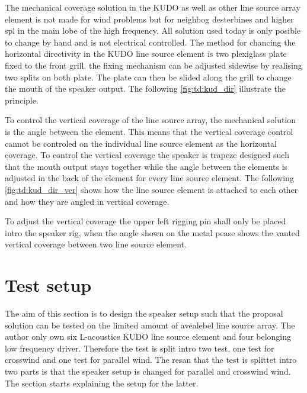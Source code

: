 


The mechanical coverage solution in the KUDO as well as other line source array element is not made for wind problems but for neighbog desterbines and higher \gls{spl} in the main lobe of the high frequency. All solution used today is only posible to change by hand and is not electrical controlled. The method for chancing the horizontal directivity in the KUDO line source element is two plexiglass plate fixed to the front grill. the fixing mechanism can be adjusted sidewise by realising two splits on both plate. The plate can then be slided along the grill to change the mouth of the speaker output. The following \autoref{fig:td:kud_dir} illustrate the principle.


To control the vertical coverage of the line source array, the mechanical solution is the angle between the element. This means that the vertical coverage control cannot be controled on the individual line source element as the horizontal coverage. To control the vertical coverage the speaker is trapeze designed such that the mouth output stays together while the angle between the elements is adjusted in the back of the element for every line source element. The following \autoref{fig:td:kud_dir_ver} shows how the line source element is attached to each other and how they are angled in vertical coverage.


To adjust the vertical coverage the upper left rigging pin shall only be placed intro the speaker rig, when the angle shown on the metal pease shows the vanted vertical coverage between two line source element.  

\section{Test setup}\label{sec:pro:test_setup}
The aim of this section is to design the speaker setup such that the proposal solution can be tested on the limited amount of avealebel line source array. The author only own six L-acoustics KUDO line source element and four belonging low frequency driver. Therefore the test is split intro two test, one test for crosswind and one test for parallel wind. The resan that the test is splittet intro two parts is that the speaker setup is changed for parallel and crosswind wind. The section starts explaining the setup for the latter.

